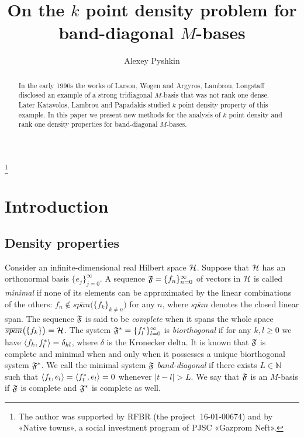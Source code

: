 \documentclass[12pt]{amsart}
\theoremstyle{case}
\begin{document}
\title{On the $k$ point density problem for band-diagonal $M$-bases}
\author{Alexey Pyshkin}
\begin{abstract}
  In the early 1990s the works of Larson, Wogen and Argyros, Lambrou, Longstaff
    disclosed an example of a strong tridiagonal $M$-basis that was not rank one dense.
  Later Katavolos, Lambrou and Papadakis studied $k$ point density property of this example.
  In this paper we present new methods for the analysis of $k$ point density
    and rank one density properties for band-diagonal $M$-bases.
\end{abstract}
\thanks{The author was supported by RFBR (the project~16-01-00674) and by «Native towns», a social investment program of PJSC «Gazprom Neft».}
\maketitle

\section{Introduction}
  \subsection{Density properties}
    Consider an infinite-dimensional real Hilbert space $\cal{H}$.
    Suppose that $\cal{H}$ has an orthonormal basis $\{e_j\}_{j=0}^\infty$.
    A sequence $\fsys=\seq{f}$ of vectors in $\cal{H}$ is called \emph{minimal} if none of its elements can be approximated by the linear combinations of the others: $f_n \notin
      \overline{span}\big(\{f_k\}_{k \ne n}\big)$ for any $n$, where $\overline{span}$ denotes the closed linear span.
    The sequence $\fsys$ is said to be \emph{complete} when it spans the whole space $\overline{span}\big(\{f_k\}\big)=\cal{H}$.
    The system $\fstarsys = \{f_l^*\}_{l=0}^\infty$ is \emph{biorthogonal} if for any $k,l \geq 0$ we have $\inner{f_k}{f^*_l} = \delta_{kl}$, where $\delta$ is the Kronecker delta.
    It is known that $\fsys$ is complete and minimal when and only when it possesses a unique biorthogonal system $\fstarsys$.
    We call the minimal system $\fsys$ \emph{band-diagonal} if there exists $L \in \mathbb{N}$ such that $\inner{f_t}{e_l} = \inner{f^*_t}{e_l} = 0$
      whenever $\lvert t - l \rvert > L$.
    We say that $\fsys$ is an $M$-basis if $\fsys$ is complete and $\fstarsys$ is complete as well.
    
\end{document}
